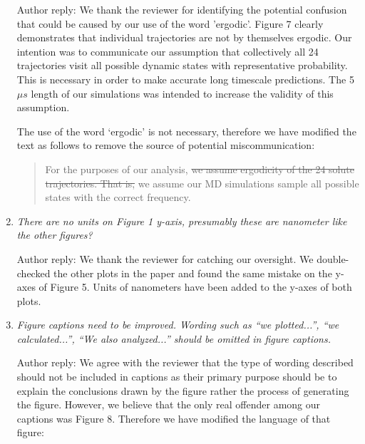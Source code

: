 \documentclass{article}
\begin{document}
\begin{enumerate}[label={Comment \theenumi :}, leftmargin=3.9\parindent]
    Author reply: We thank the reviewer for identifying the potential confusion that could be
    caused by our use of the word 'ergodic'. Figure 7 clearly demonstrates that individual trajectories
    are not by themselves ergodic. Our intention was to communicate our assumption that collectively all 24 
    trajectories visit all possible dynamic states with representative probability. This is 
    necessary in order to make accurate long timescale predictions. The 5 $\mu s$ length of our 
    simulations was intended to increase the validity of this assumption. 
    
    The use of the word `ergodic' is not necessary, therefore we have modified the text as follows
    to remove the source of potential miscommunication:
    
    \begin{quote}
    For the purposes of our analysis, \sout{we assume ergodicity of the 24 solute trajectories. That is,}
    we assume our MD simulations sample all possible states with the correct frequency.
    \end{quote}    
    
    \item \textit{There are no units on Figure 1 y-axis, presumably these are nanometer like the 
    other figures?}
    
    Author reply: We thank the reviewer for catching our oversight. We double-checked the 
    other plots in the paper and found the same mistake on the y-axes of Figure 5. Units of nanometers
    have been added to the y-axes of both plots.
    
    \item \textit{Figure captions need to be improved. Wording such as “we plotted...”, “we 
    calculated...”, “We also analyzed...” should be omitted in figure captions.}  
    
    Author reply: We agree with the reviewer that the type of wording described should not be
    included in captions as their primary purpose should be to explain the conclusions drawn
    by the figure rather the process of generating the figure. However, we believe that the 
    only real offender among our captions was Figure 8. Therefore we have modified the language
    of that figure:
    

\end{enumerate}
\end{document}
